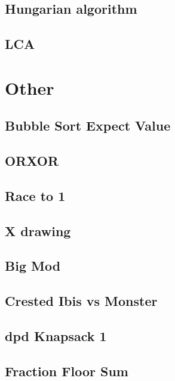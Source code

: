         \subsection{Hungarian algorithm}
                
        \subsection{LCA}
                

\section{Other}
        \subsection{Bubble Sort Expect Value}
                
        \subsection{ORXOR}
                
        \subsection{Race to 1}
                
        \subsection{X drawing}
                
        \subsection{Big Mod}
                
        \subsection{Crested Ibis vs Monster}
                
        \subsection{dpd Knapsack 1}
                
        \subsection{Fraction Floor Sum}
                
